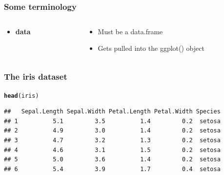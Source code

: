 \documentclass{beamer}\usepackage[]{graphicx}\usepackage[]{color}
\makeatletter
\newcommand{\hlstd}[1]{\textcolor[rgb]{0.345,0.345,0.345}{#1}}%
\newcommand{\hlkwd}[1]{\textcolor[rgb]{0.737,0.353,0.396}{\textbf{#1}}}%
\newenvironment{kframe}{%
 \def\at@end@of@kframe{}%
 \ifinner\ifhmode%
  \def\at@end@of@kframe{\end{minipage}}%
  \begin{minipage}{\columnwidth}%
 \fi\fi%
 \def\FrameCommand##1{\hskip\@totalleftmargin \hskip-\fboxsep
 \colorbox{shadecolor}{##1}\hskip-\fboxsep
     \hskip-\linewidth \hskip-\@totalleftmargin \hskip\columnwidth}%
 \MakeFramed {\advance\hsize-\width
   \@totalleftmargin\z@ \linewidth\hsize
   \@setminipage}}%
 {\par\unskip\endMakeFramed%
 \at@end@of@kframe}
\newenvironment{knitrout}{}{} %
\makeatother
\begin{document}

\begin{frame}[fragile]
\frametitle{Some terminology}
\begin{columns}[t]

\begin{column}[T]{3cm}
\begin{itemize}
    \item \textbf{data}
\end{itemize}
\end{column}

\begin{column}[T]{8cm}
\begin{itemize}
    \item Must be a data.frame
    \item Gets pulled into the ggplot() object
\end{itemize}
\end{column}

\end{columns}
\end{frame}


\begin{frame}[fragile]
\frametitle{The iris dataset}
\begin{knitrout}\footnotesize
{}\color{fgcolor}\begin{kframe}
\begin{alltt}
\hlkwd{head}\hlstd{(iris)}
\end{alltt}
\begin{verbatim}
##   Sepal.Length Sepal.Width Petal.Length Petal.Width Species
## 1          5.1         3.5          1.4         0.2  setosa
## 2          4.9         3.0          1.4         0.2  setosa
## 3          4.7         3.2          1.3         0.2  setosa
## 4          4.6         3.1          1.5         0.2  setosa
## 5          5.0         3.6          1.4         0.2  setosa
## 6          5.4         3.9          1.7         0.4  setosa
\end{verbatim}
\end{kframe}
\end{knitrout}
\end{frame}

\end{document}
